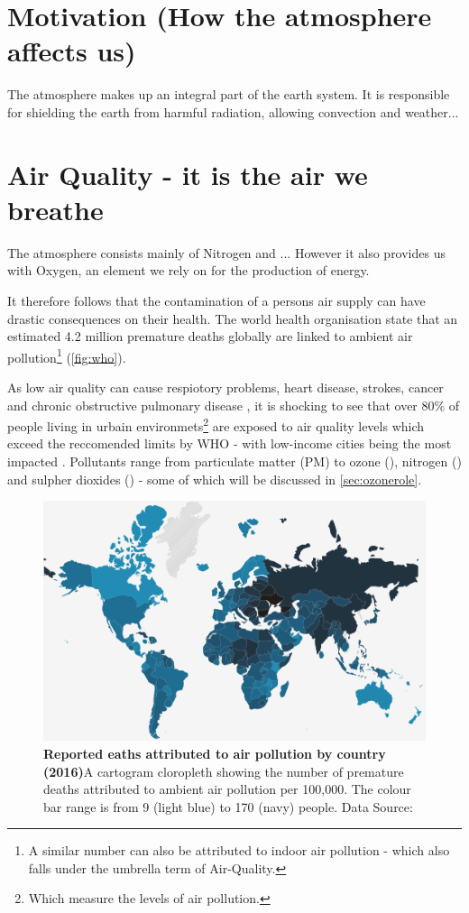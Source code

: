 

\section{Motivation (How the atmosphere affects us)}
The atmosphere makes up an integral part of the earth system. It is responsible for shielding the earth from harmful radiation, allowing convection  and weather...



\section{Air Quality - it is the air we breathe}
The atmosphere consists mainly of Nitrogen and ...
However it also provides us with Oxygen, an element we rely on for the production of energy.

It therefore follows that the contamination of a persons air supply can have drastic consequences on their health. The world health organisation \citep{who} state that an estimated 4.2 million premature deaths globally are linked to ambient air pollution\footnote{A similar number can also be attributed to indoor air pollution - which also falls under the umbrella term of Air-Quality.} (\autoref{fig:who}).

As low air quality can cause respiotory problems, heart disease, strokes, cancer and chronic obstructive pulmonary disease \cite{who}, it is shocking to see that over 80\% of people living in urbain environmets\footnote{Which measure the levels of air pollution.} are exposed to air quality levels which exceed the reccomended limits by WHO - with low-income cities being the most impacted \citep{whodata}.
Pollutants range from particulate matter (PM) to ozone (), nitrogen () and sulpher dioxides  () - some of which will be discussed in \autoref{sec:ozonerole}.


\begin{figure}[H]
  \centering
  \includegraphics[width=\textwidth]{who.png}
  \caption{\textbf{Reported eaths attributed to air pollution by country (2016)}A cartogram cloropleth showing the number of premature deaths attributed to ambient air pollution per 100,000. The colour bar range is from 9 (light blue) to 170 (navy) people.  Data Source:\citep{whodata}}
  \label{fig:who}
\end{figure}

